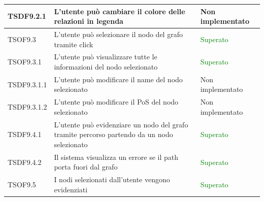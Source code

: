 \documentclass[openany,12pt,a4paper]{report}
\begin{document}
\begin{longtable}[c]{| p{2cm} |p{8cm} | p{2.5cm} |}
	\newline TSDF9.2.1&
	\newline L'utente può cambiare il colore delle relazioni in legenda&
	\newline Non implementato
	\\[1em]
	\hline
	
	\newline TSOF9.3&
	\newline L'utente può selezionare il nodo del grafo tramite click&
	\newline \textcolor{green}{Superato}
	\\[1em]
	\hline
	
	\newline TSOF9.3.1&
	\newline L'utente può visualizzare tutte le informazioni del nodo selezionato&
	\newline \textcolor{green}{Superato}
	\\[1em]
	\hline
	
	\newline TSDF9.3.1.1&
	\newline L'utente può modificare il name del nodo selezionato&
	\newline Non implementato
	\\[1em]
	\hline
	
	\newline TSDF9.3.1.2&
	\newline L'utente può modificare il PoS del nodo selezionato&
	\newline Non implementato
	\\[1em]
	\hline
	
	\newline TSDF9.4.1&
	\newline L'utente può evidenziare un nodo del grafo tramite percorso partendo da un nodo selezionato&
	\newline \textcolor{green}{Superato}
	\\[1em]
	\hline
	
	\newline TSDF9.4.2&
	\newline Il sistema visualizza un errore se il path porta fuori dal grafo&
	\newline \textcolor{green}{Superato}
	\\[1em]
	\hline
	
	\newline TSOF9.5&
	\newline I nodi selezionati dall'utente vengono evidenziati&
	\newline \textcolor{green}{Superato}
	\\[1em]
	\hline
	

\end{longtable}
\end{document}
